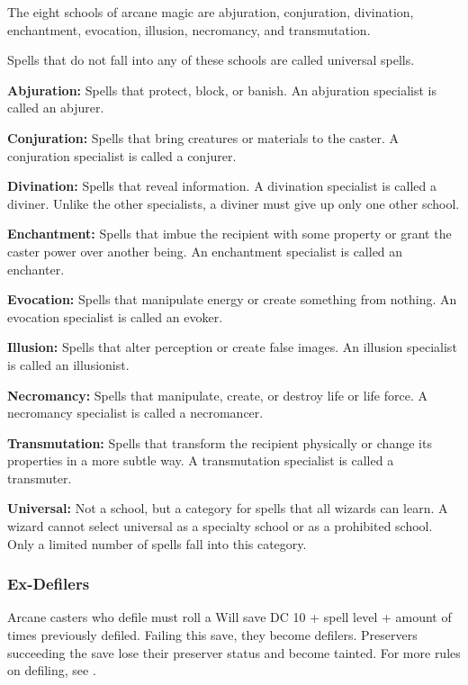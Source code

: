 The eight schools of arcane magic are abjuration, conjuration, divination, enchantment, evocation, illusion, necromancy, and transmutation.

Spells that do not fall into any of these schools are called universal spells.



\textbf{Abjuration:} Spells that protect, block, or banish. An abjuration specialist is called an abjurer.

\textbf{Conjuration:} Spells that bring creatures or materials to the caster. A conjuration specialist is called a conjurer.

\textbf{Divination:} Spells that reveal information. A divination specialist is called a diviner. Unlike the other specialists, a diviner must give up only one other school.

\textbf{Enchantment:} Spells that imbue the recipient with some property or grant the caster power over another being. An enchantment specialist is called an enchanter.

\textbf{Evocation:} Spells that manipulate energy or create something from nothing. An evocation specialist is called an evoker.

\textbf{Illusion:} Spells that alter perception or create false images. An illusion specialist is called an illusionist.

\textbf{Necromancy:} Spells that manipulate, create, or destroy life or life force. A necromancy specialist is called a necromancer.

\textbf{Transmutation:} Spells that transform the recipient physically or change its properties in a more subtle way. A transmutation specialist is called a transmuter.

\textbf{Universal:} Not a school, but a category for spells that all wizards can learn. A wizard cannot select universal as a specialty school or as a prohibited school. Only a limited number of spells fall into this category.

\subsubsection{Ex-Defilers}
Arcane casters who defile must roll a Will save DC 10 + spell level + amount of times previously defiled. Failing this save, they become defilers. Preservers succeeding the save lose their preserver status and become tainted. For more rules on defiling, see .

